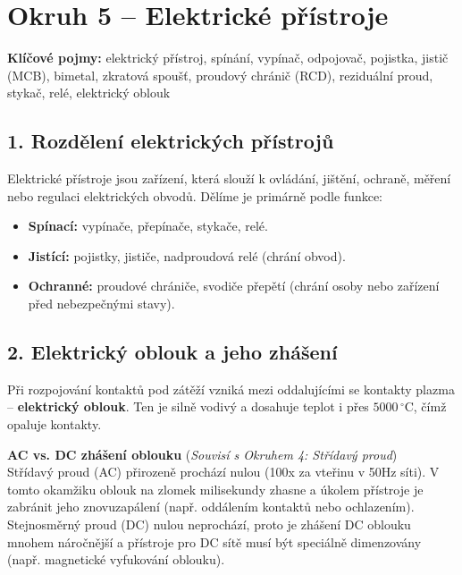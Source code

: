 \documentclass[a4paper,10pt]{article}
\begin{document}
\section*{\large Okruh 5 – Elektrické přístroje}

\begin{pojmybox}
\textbf{Klíčové pojmy:}
elektrický přístroj, spínání, vypínač, odpojovač, pojistka, jistič (MCB), bimetal, zkratová spoušť, proudový chránič (RCD), reziduální proud, stykač, relé, elektrický oblouk
\end{pojmybox}

\begin{vysvetlenibox}

\subsection*{1. Rozdělení elektrických přístrojů}

Elektrické přístroje jsou zařízení, která slouží k ovládání, jištění, ochraně, měření nebo regulaci elektrických obvodů. Dělíme je primárně podle funkce:
\begin{itemize}
  \item \textbf{Spínací:} vypínače, přepínače, stykače, relé.
  \item \textbf{Jistící:} pojistky, jističe, nadproudová relé (chrání obvod).
  \item \textbf{Ochranné:} proudové chrániče, svodiče přepětí (chrání osoby nebo zařízení před nebezpečnými stavy).
\end{itemize}

\subsection*{2. Elektrický oblouk a jeho zhášení}

Při rozpojování kontaktů pod zátěží vzniká mezi oddalujícími se kontakty plazma – \textbf{elektrický oblouk}. Ten je silně vodivý a dosahuje teplot i přes $5000\,^\circ\mathrm{C}$, čímž opaluje kontakty.

\begin{durazbox}
\textbf{AC vs. DC zhášení oblouku} (\textit{Souvisí s Okruhem 4: Střídavý proud})\\
Střídavý proud (AC) přirozeně prochází nulou (100x za vteřinu v 50Hz síti). V tomto okamžiku oblouk na zlomek milisekundy zhasne a úkolem přístroje je zabránit jeho znovuzapálení (např. oddálením kontaktů nebo ochlazením). Stejnosměrný proud (DC) nulou neprochází, proto je zhášení DC oblouku mnohem náročnější a přístroje pro DC sítě musí být speciálně dimenzovány (např. magnetické vyfukování oblouku).
\end{durazbox}


\end{vysvetlenibox}
\end{document}
